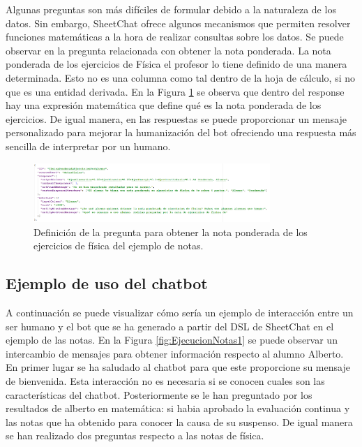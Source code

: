 Algunas preguntas son más difíciles de formular debido a la naturaleza de los datos. Sin embargo, SheetChat ofrece algunos mecanismos que permiten resolver funciones matemáticas a la hora de realizar consultas sobre los datos. Se puede observar en la pregunta relacionada con obtener la nota ponderada. La nota ponderada de los ejercicios de Física el profesor lo tiene definido de una manera determinada. Esto no es una columna como tal dentro de la hoja de cálculo, si no que es una entidad derivada. En la Figura \ref{fig:DSLNotasPonderada} se observa que dentro del response hay una expresión matemática que define qué es la nota ponderada de los ejercicios. De igual manera, en las respuestas se puede proporcionar un mensaje personalizado para mejorar la humanización del bot ofreciendo una respuesta más sencilla de interpretar por un humano.

\begin{figure}[htb]
	\centering
	\includegraphics[width=0.8\textwidth]{./figs/DSLNotasPonderada.png}
	\caption{Definición de la pregunta para obtener la nota ponderada de los ejercicios de física del ejemplo de notas.}
	\label{fig:DSLNotasPonderada}
\end{figure}

\subsection{Ejemplo de uso del chatbot}

A continuación se puede visualizar cómo sería un ejemplo de interacción entre un ser humano y el bot que se ha generado a partir del DSL de SheetChat en el ejemplo de las notas. En la Figura \ref{fig:EjecucionNotas1} se puede observar un intercambio de mensajes para obtener información respecto al alumno Alberto. En primer lugar se ha saludado al chatbot para que este proporcione su mensaje de bienvenida. Esta interacción no es necesaria si se conocen cuales son las características del chatbot. Posteriormente se le han preguntado por los resultados de alberto en matemática: si habia aprobado la evaluación continua y las notas que ha obtenido para conocer la causa de su suspenso. De igual manera se han realizado dos preguntas respecto a las notas de física.

